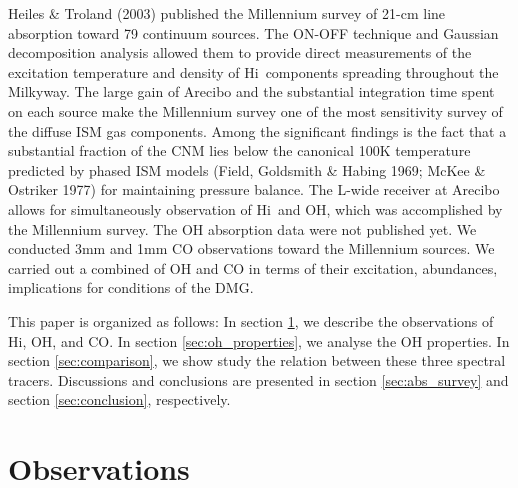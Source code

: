 \documentclass[preprint]{emulateapj}
\def\hi{H{\sc i}}
\begin{document}
Heiles \& Troland (2003) published the  Millennium survey of 21-cm line absorption toward 79 continuum sources. The ON-OFF technique and Gaussian decomposition analysis allowed them to provide direct measurements of the excitation temperature and density of \hi\ components spreading throughout the Milkyway. The large gain of Arecibo and the substantial integration time spent on each source make the Millennium survey one of the most sensitivity survey of the diffuse ISM gas components.
Among the significant findings is the fact that a substantial fraction of the CNM lies below the canonical 100K temperature predicted by phased ISM models (Field, Goldsmith \& Habing 1969; McKee \& Ostriker 1977) for maintaining pressure balance. The L-wide receiver at Arecibo allows for simultaneously observation of \hi\ and OH, which was accomplished by the Millennium survey. The OH absorption data were not published yet. We conducted  3mm and 1mm CO observations toward the Millennium sources. We carried out a combined  of OH and CO in terms of their excitation, abundances, implications for conditions of the DMG.

This paper is organized as follows: In section \ref{sec:observations}, we describe the observations of \hi, OH, and CO. In section \ref{sec:oh_properties}, we analyse the OH properties. In section \ref{sec:comparison}, we show study the relation between these three spectral tracers. Discussions and conclusions are presented in section \ref{sec:abs_survey} and section \ref{sec:conclusion}, respectively. 


\section{Observations}
\label{sec:observations}
\end{document}
